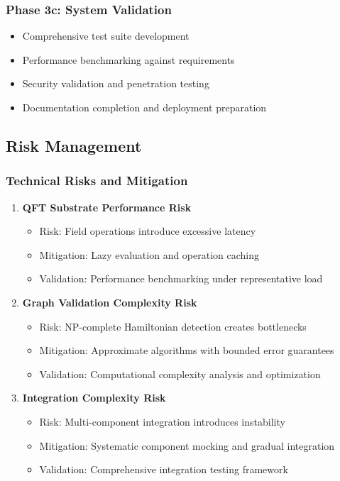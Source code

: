 \documentclass[12pt]{article}
\begin{document}
\subsubsection{Phase 3c: System Validation}
\begin{itemize}
    \item Comprehensive test suite development
    \item Performance benchmarking against requirements
    \item Security validation and penetration testing
    \item Documentation completion and deployment preparation
\end{itemize}

\subsection{Risk Management}

\subsubsection{Technical Risks and Mitigation}

\begin{enumerate}
    \item \textbf{QFT Substrate Performance Risk}
        \begin{itemize}
            \item Risk: Field operations introduce excessive latency
            \item Mitigation: Lazy evaluation and operation caching
            \item Validation: Performance benchmarking under representative load
        \end{itemize}
    
    \item \textbf{Graph Validation Complexity Risk}
        \begin{itemize}
            \item Risk: NP-complete Hamiltonian detection creates bottlenecks
            \item Mitigation: Approximate algorithms with bounded error guarantees
            \item Validation: Computational complexity analysis and optimization
        \end{itemize}
    
    \item \textbf{Integration Complexity Risk}
        \begin{itemize}
            \item Risk: Multi-component integration introduces instability
            \item Mitigation: Systematic component mocking and gradual integration
            \item Validation: Comprehensive integration testing framework
        \end{itemize}
\end{enumerate}
\end{document}
